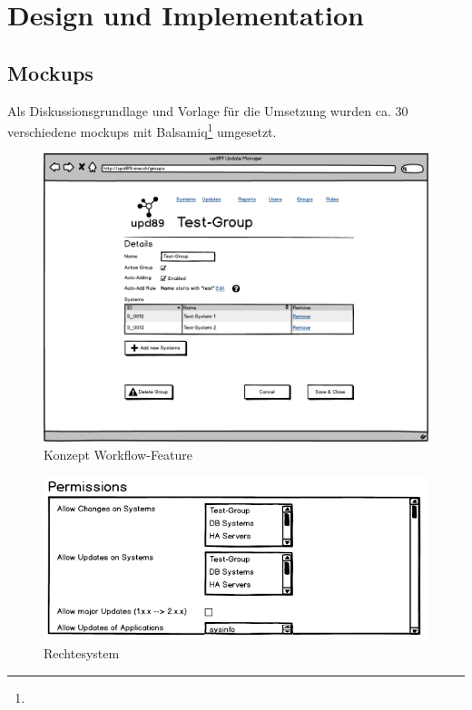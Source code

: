 \section{Design und Implementation}

\xxx

\subsection*{Mockups}

Als Diskussionsgrundlage und Vorlage für die Umsetzung wurden ca. 30 verschiedene \glspl{mockup} mit Balsamiq\footnote{} umgesetzt.

\begin{figure}[H]
	\centering
	\includegraphics[width=\linewidth]{files/mockups/group_systems}
	\caption{Konzept Workflow-Feature}
	\label{fig:design:group_users_mockup}
\end{figure}



\begin{figure}[H]
	\centering
	\includegraphics[width=0.75\linewidth]{files/mockups/permission_1}
	\caption{Rechtesystem}
	\label{fig:design:permission_1}
\end{figure}

